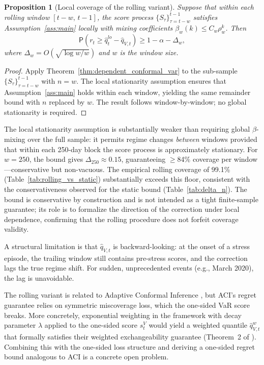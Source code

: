 \documentclass[preprint,11pt,authoryear]{elsarticle}
\newtheorem{proposition}[theorem]{Proposition}
\renewcommand{\P}{\mathsf{P}}
\newcommand{\1}{\boldsymbol{1}}
\begin{document}
	\begin{proposition}[Local coverage of the rolling variant]
		\label{prop:rolling_coverage}
		Suppose that within each rolling window $[t-w,\, t-1]$, the
		score process $\{S_\tau\}_{\tau=t-w}^{t-1}$ satisfies
		Assumption~\ref{ass:main} locally with mixing coefficients
		$\beta_w(k) \leq C_w \rho_w^k$. Then
		\[
		\P\!\left(r_t \geq \hat{q}_t^{lo} - \hat{q}_{V,t}\right)
		\geq 1 - \alpha - \Delta_w,
		\]
		where $\Delta_w = O(\sqrt{\log w / w})$ and $w$ is the window
		size.
	\end{proposition}

	\begin{proof}
		Apply Theorem~\ref{thm:dependent_conformal_var} to the
		sub-sample $\{S_\tau\}_{\tau=t-w}^{t-1}$ with $n = w$. The
		local stationarity assumption ensures that
		Assumption~\ref{ass:main} holds within each window, yielding
		the same remainder bound with $n$ replaced by $w$. The result
		follows window-by-window; no global stationarity is required.
	\end{proof}

	The local stationarity assumption is substantially weaker than
	requiring global $\beta$-mixing over the full sample: it permits
	regime changes \emph{between} windows provided that within each
	250-day block the score process is approximately stationary.
	For $w = 250$, the bound gives $\Delta_{250} \approx 0.15$,
	guaranteeing $\geq$84\% coverage per window---conservative but
	non-vacuous. The empirical rolling coverage of 99.1\%
	(Table~\ref{tab:rolling_vs_static}) substantially exceeds this
	floor, consistent with the conservativeness observed for the
	static bound (Table~\ref{tab:delta_n}).
	The bound is conservative by construction and is not intended as a tight finite-sample guarantee; its role is to formalize the direction of the correction under local dependence, confirming that the rolling procedure does not forfeit coverage validity.

	A structural limitation is that $\hat{q}_{V,t}$ is
	backward-looking: at the onset of a stress episode, the trailing
	window still contains pre-stress scores, and the correction
	lags the true regime shift. For sudden, unprecedented
	events (e.g., March 2020), the lag is unavoidable.

	The rolling variant is related to Adaptive Conformal
	Inference \citep{gibbs2021adaptive}, but ACI's regret
	guarantee relies on symmetric miscoverage loss, which the
	one-sided VaR score breaks. More concretely, exponential
	weighting in the \citet{barber2023conformal} framework with
	decay parameter $\lambda$ applied to the one-sided score
	$s_t^V$ would yield a weighted quantile
	$\hat{q}_{V,t}^{w}$ that formally satisfies their weighted
	exchangeability guarantee (Theorem~2 of
	\citealt{barber2023conformal}). Combining this with the
	one-sided loss structure and deriving a one-sided regret
	bound analogous to ACI is a concrete open problem.
	
\end{document}
